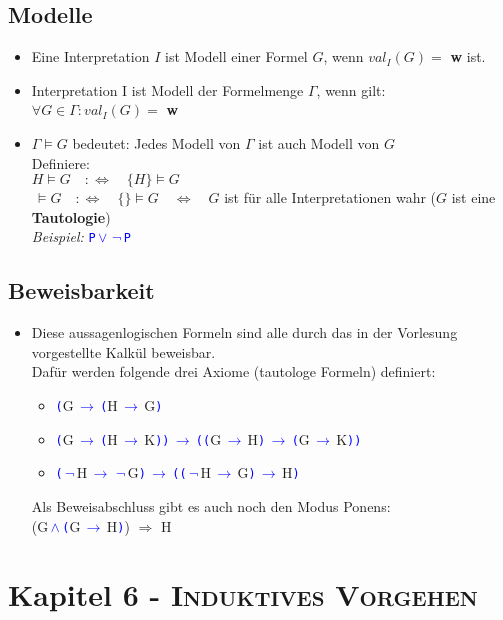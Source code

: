 \documentclass{article}
\newcommand{\kapitel}[2]{Kapitel #1 - \textsc{#2}}
\newcommand{\blue}[1]{\textcolor{blue}{#1}}
\newcommand{\strongColor}[1]{\textcolor{strongColor}{#1}}
\newcommand{\strong}[1]{\textbf{\strongColor{#1}}}
\newcommand{\important}[1]{\textcolor{importantColor}{#1}}
\newcommand{\example}[1]{\textit{Beispiel: }#1}
\newcommand{\word}[1]{\blue{\texttt{#1}}}
\newcommand{\set}[1]{\{#1\}}
\newcommand{\anfuehrung}[1]{\flqq #1\frqq}
\newcommand{\wnot}{$\,$\word{$\lnot$}$\,$}
\newcommand{\wand}{$\,$\word{$\land$}$\,$}
\newcommand{\wor}{$\,$\word{$\lor$}$\,$}
\newcommand{\wimpl}{$\,$\word{$\rightarrow$}$\,$}
\begin{document}
\subsection{Modelle}
\begin{itemize}
    \item Eine Interpretation $I$ ist \important{Modell} einer Formel $G$, wenn $val_I(G)=$ \textbf{w} ist.
    \item Interpretation I ist \important{Modell} der Formelmenge \strong{$\Gamma$}, wenn gilt:\\
    $\forall G \in \Gamma: val_I(G)=$ \textbf{w}
    \item $\Gamma \models G$ bedeutet: \anfuehrung{Jedes Modell von $\Gamma$ ist auch Modell von $G$}\\
    Definiere: \\$H\models G \quad :\Leftrightarrow \quad \set{H}\models G$\\
    \null\quad$\,\models G \quad :\Leftrightarrow \quad \set{} \models G \quad \Leftrightarrow \quad G$ ist für \important{alle} Interpretationen wahr ($G$ ist eine \strong{Tautologie})\\
    \example{\word{P\wor \wnot P}}
\end{itemize}
\subsection{Beweisbarkeit}
\begin{itemize}
    \item Diese aussagenlogischen Formeln sind alle durch das in der Vorlesung vorgestellte Kalkül beweisbar.\\Dafür werden folgende drei Axiome (tautologe Formeln) definiert: 
    \begin{itemize}
        \item \word{(}G\wimpl \word{(}H\wimpl G\word{)}
        \item \word{(}G\wimpl \word{(}H\wimpl K\word{))}\wimpl\word{((}G\wimpl H\word{)}\wimpl\word{(}G\wimpl K\word{))}
        \item \word{(}\wnot H\wimpl\wnot G\word{)}\wimpl\word{((}\wnot H\wimpl G\word{)}\wimpl H\word{)}
    \end{itemize}
    Als Beweisabschluss gibt es auch noch den \important{Modus Ponens}:\\
    (G\wand\word{(}G\wimpl H\word{)}) $\Rightarrow$ H
\end{itemize}

\newpage
\section{\kapitel{6}{Induktives Vorgehen}}
\end{document}
